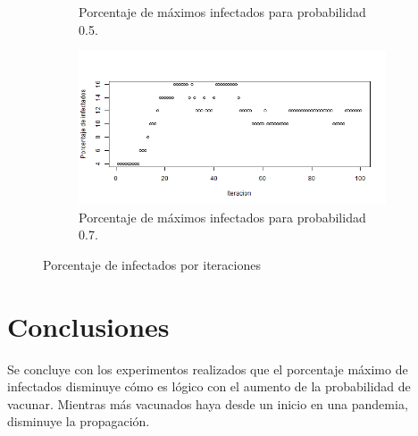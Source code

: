 \documentclass{article}
\begin{document}
\begin{figure}[H]
\begin{subfigure}[b]{0.45\linewidth}
			\caption{Porcentaje de máximos infectados para probabilidad 0.5.}
			\label{3}
	\end{subfigure}
		\begin{subfigure}[b]{0.45\linewidth}
				\includegraphics[width=\linewidth]{p6e07.png}
				\caption{Porcentaje de máximos infectados para probabilidad 0.7.}
				\label{4}
	\end{subfigure}
	\caption{Porcentaje de infectados por iteraciones}  		
\end{figure}



\section{Conclusiones}
Se concluye con los experimentos realizados que el porcentaje máximo de infectados disminuye cómo es lógico con el aumento de la probabilidad de vacunar. Mientras más vacunados haya desde un inicio en una pandemia, disminuye la propagación. 



\end{document}

